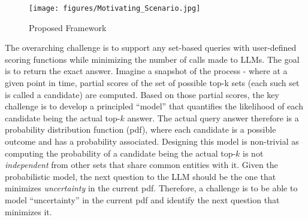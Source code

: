 
\begin{figure}[ht]
    \centering
    \texttt{[image: figures/Motivating\_Scenario.jpg]}
    \caption{\small Proposed Framework}
    \label{fig:motivating_scenario}
\end{figure}

\smallskip {} 
The overarching challenge is to support any set-based queries with user-defined scoring functions while minimizing the number of calls made to LLMs. The goal is to return the exact answer. Imagine a snapshot of the process - where at a given point in time, partial scores of the set of possible top-k sets (each such set is called a candidate) are computed. Based on those partial scores, the key challenge is to develop a principled ``model'' that quantifies the likelihood of each candidate being the actual top-$k$ answer. The actual query answer therefore is a probability distribution function (pdf), where each candidate is a possible outcome and has a probability associated. Designing this model is non-trivial as computing the probability of a candidate  being the actual top-$k$ is not {\em independent} from other sets that share common entities with it. Given the probabilistic model, the next question to the LLM should be the one that minimizes {\em uncertainty} in the current pdf. Therefore, a challenge is to be able to model ``uncertainty'' in the current pdf and identify the next question that minimizes it. %

